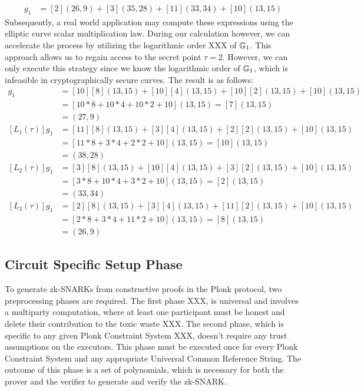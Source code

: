 \begin{example}
\begin{align*}
[L_3(\tau)]g_1 & = [2](26,9) + [3](35,28) +[11](33,34) +[10](13,15)
\end{align*}
Subsequently, a real world application may compute these expressions using the elliptic curve scalar multiplication law. During our calculation however, we can accelerate the process by utilizing the logarithmic order XXX of $\mathbb{G}_1$. This approach allows us to regain access to the secret point $\tau=2$. However, we can only execute this strategy since we know the logarithmic order of $\mathbb{G}_1$, which is infeasible in cryptographically secure curves. The result is as follows:
\begin{align*}
[L_0(\tau)]g_1 & = [10][8](13,15) + [10][4](13,15) + [10][2](13,15) + [10](13,15)\\
               & = [10*8 + 10*4 + 10*2 + 10](13,15) = [7] (13,15)\\
               & = (27,9)\\
[L_1(\tau)]g_1 & = [11][8](13,15) +[3][4](13,15) +[2][2](13,15) + [10](13,15) \\
               & = [11*8+3*4+2*2+10](13,15) = [10](13,15) \\
               & = (38,28)\\
[L_2(\tau)]g_1 & = [3][8](13,15) + [10][4](13,15) + [3][2](13,15) + [10](13,15) \\
               & = [3*8+10*4+3*2+10](13,15) = [2](13,15) \\
               & = (33,34)\\
[L_3(\tau)]g_1 & = [2][8](13,15) + [3][4](13,15) +[11][2](13,15) +[10](13,15)\\
               & = [2*8+3*4+11*2+10](13,15) = [8](13,15)\\
               & = (26,9)
\end{align*}
\end{example}


\subsection{Circuit Specific Setup Phase}
To generate zk-SNARKs from constructive proofs in the Plonk protocol, two preprocessing phases are required. The first phase XXX, is universal and involves  a multiparty computation, where at least one participant must be honest and delete their contribution to the toxic waste XXX. The second phase, which is specific to any given Plonk Constraint System XXX, doesn't require any trust assumptions on the executors. This phase must be executed once for every Plonk Constraint System and any appropriate Universal Common Reference String. The outcome of this phase is a set of polynomials, which is necessary for both the prover and the verifier to generate and verify the zk-SNARK.

